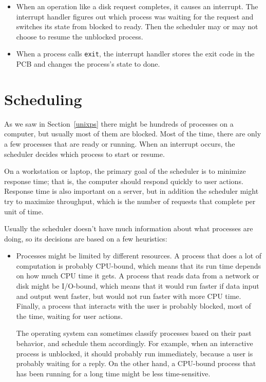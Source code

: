\documentclass[12pt]{book}
\begin{document}
{\begin{itemize}
\item When an operation like a disk request completes, it causes an
  interrupt.  The interrupt handler figures out which process was
  waiting for the request and switches its state from
  blocked to ready.  Then the scheduler may or may not choose to
  resume the unblocked process.

\item When a process calls {\tt exit}, the interrupt handler stores
  the exit code in the PCB and changes the process's state to done.

\end{itemize}


\section{Scheduling}

As we saw in Section~\ref{unixps} there might be hundreds of
processes on a computer, but usually most of them are blocked.  Most
of the time, there are only a few processes that are ready or running.
When an interrupt occurs, the scheduler decides which process to start
or resume.

On a workstation or laptop, the primary goal of the scheduler is to
minimize response time; that is, the computer should respond quickly
to user actions.  Response time is also important on a server, but in
addition the scheduler might try to maximize throughput, which is the
number of requests that complete per unit of time.

Usually the scheduler doesn't have much information about what
processes are doing, so its decisions are based on a few
heuristics:

\begin{itemize}

\item Processes might be limited by different resources.  A process
that does a lot of computation is probably CPU-bound, which means that
its run time depends on how much CPU time it gets.  A process that
reads data from a network or disk might be I/O-bound, which means that
it would run faster if data input and output went faster, but would not
run faster with more CPU time.  Finally, a process that interacts with
the user is probably blocked, most of the time, waiting for user actions.

The operating system can sometimes classify processes based on their
past behavior, and schedule them accordingly.  For example, when an
interactive process is unblocked, it should probably run immediately,
because a user is probably waiting for a reply.  On the other hand,
a CPU-bound process that has been running for a long time might be
less time-sensitive.


\end{itemize}}
\end{document}

